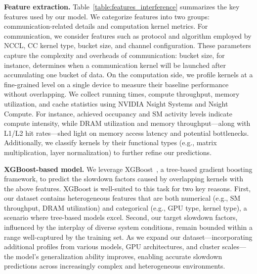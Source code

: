 \noindent\textbf{Feature extraction.} 
Table~\ref{table:features_interference} summarizes the key features used by our model. We categorize features into two groups: communication-related details and computation kernel metrics. 
For communication, we consider features such as protocol and algorithm employed by NCCL, CC kernel type, bucket size, and channel configuration. These parameters capture the complexity and overheads of communication: bucket size, for instance, determines when a communication kernel will be launched after accumulating one bucket of data. 
On the computation side, we profile kernels at a fine-grained level on a single device to measure their baseline performance without overlapping. 
We collect running times, compute throughput, memory utilization, and cache statistics using NVIDIA Nsight Systems and Nsight Compute. 
For instance, achieved occupancy and SM activity levels indicate compute intensity, while DRAM utilization and memory throughput---along with L1/L2 hit rates---shed light on memory access latency and potential bottlenecks. Additionally, we classify kernels by their functional types (e.g., matrix multiplication, layer normalization) to further refine our predictions.

\noindent\textbf{XGBoost-based model.} We leverage XGBoost~\cite{xgboost}, a tree-based gradient boosting framework, to predict the slowdown factors caused by overlapping kernels with the above features. 
XGBoost is well-suited to this task for two key reasons. First, our dataset contains heterogeneous features that are both numerical (e.g., SM throughput, DRAM utilization) and categorical (e.g., GPU type, kernel type), a scenario where tree-based models excel. 
Second, our target slowdown factors, influenced by the interplay of diverse system conditions, remain bounded within a range well-captured by the training set. As we expand our dataset---incorporating additional profiles from various models, GPU architectures, and cluster scales---the model's generalization ability improves, enabling accurate slowdown predictions across increasingly complex and heterogeneous environments.

